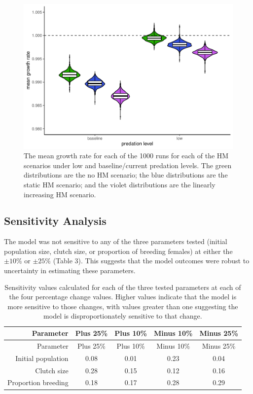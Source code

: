 \documentclass[11pt,]{article}
\begin{document}
\begin{figure}
\centering
\includegraphics{kea_PVA_manuscript_files/figure-latex/Average growth rate for HIM violin plot-1.pdf}
\caption{The mean growth rate for each of the 1000 runs for each of the
HM scenarios under low and baseline/current predation levels. The green
distributions are the no HM scenario; the blue distributions are the
static HM scenario; and the violet distributions are the linearly
increasing HM scenario.}
\end{figure}

\hypertarget{sensitivity-analysis}{%
\subsection{Sensitivity Analysis}\label{sensitivity-analysis}}

The model was not sensitive to any of the three parameters tested
(initial population size, clutch size, or proportion of breeding
females) at either the \(\pm 10 \%\) or \(\pm 25 \%\) (Table 3). This
suggests that the model outcomes were robust to uncertainty in
estimating these parameters.

\begin{longtable}[]{@{}rcccc@{}}
\caption{Sensitivity values calculated for each of the three tested
parameters at each of the four percentage change values. Higher values
indicate that the model is more sensitive to those changes, with values
greater than one suggesting the model is disproportionately sensitive to
that change.}\tabularnewline
\toprule
Parameter & Plus 25\% & Plus 10\% & Minus 10\% & Minus
25\%\tabularnewline
\midrule
\endfirsthead
\toprule
Parameter & Plus 25\% & Plus 10\% & Minus 10\% & Minus
25\%\tabularnewline
\midrule
\endhead
Initial population & 0.08 & 0.01 & 0.23 & 0.04\tabularnewline
Clutch size & 0.28 & 0.15 & 0.12 & 0.16\tabularnewline
Proportion breeding & 0.18 & 0.17 & 0.28 & 0.29\tabularnewline
\bottomrule
\end{longtable}
\end{document}
